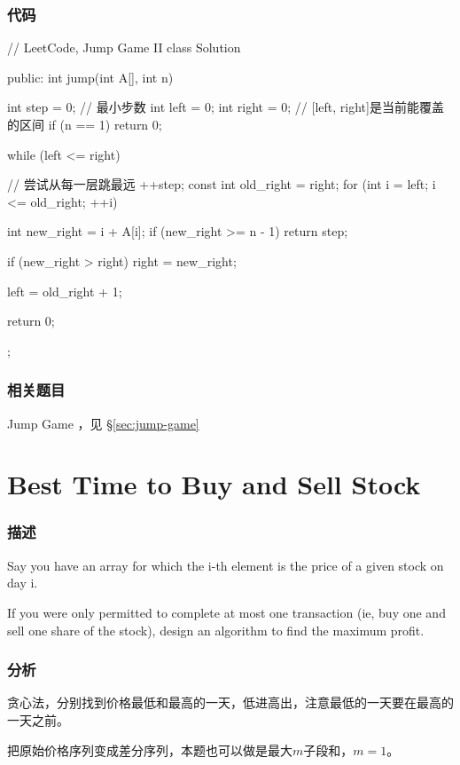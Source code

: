 \subsubsection{代码}
\begin{Code}
// LeetCode, Jump Game II
class Solution {
public:
    int jump(int A[], int n) {
        int step = 0; // 最小步数
        int left = 0;
        int right = 0;  // [left, right]是当前能覆盖的区间
        if (n == 1) return 0;

        while (left <= right) { // 尝试从每一层跳最远
            ++step;
            const int old_right = right;
            for (int i = left; i <= old_right; ++i) {
                int new_right = i + A[i];
                if (new_right >= n - 1) return step;

                if (new_right > right) right = new_right;
            }
            left = old_right + 1;
        }
        return 0;
    }
};
\end{Code}


\subsubsection{相关题目}
\begindot
\item Jump Game ，见 \S \ref{sec:jump-game}
\myenddot


\section{Best Time to Buy and Sell Stock} %
\label{sec:best-time-to-buy-and-sell-stock}


\subsubsection{描述}
Say you have an array for which the i-th element is the price of a given stock on day i.

If you were only permitted to complete at    most one transaction (ie, buy one and sell one share of the stock), design an algorithm to find the maximum profit.


\subsubsection{分析}
贪心法，分别找到价格最低和最高的一天，低进高出，注意最低的一天要在最高的一天之前。

把原始价格序列变成差分序列，本题也可以做是最大$m$子段和，$m=1$。

